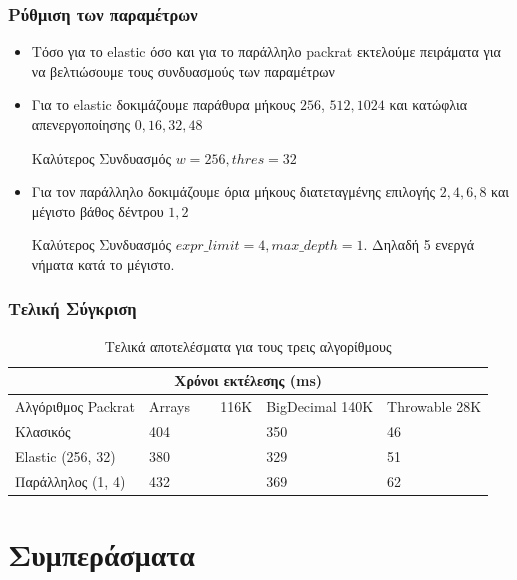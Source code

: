 \documentclass{beamer}
\begin{document}
\begin{frame}
  \frametitle{Ρύθμιση των παραμέτρων}
  \begin{itemize}
	\item Τόσο για το elastic όσο και για το παράλληλο packrat εκτελούμε πειράματα για να βελτιώσουμε τους συνδυασμούς των παραμέτρων \pause
	\item Για το elastic δοκιμάζουμε παράθυρα μήκους $256$, $512, 1024$ και κατώφλια απενεργοποίησης $0, 16, 32, 48$ \pause
	  \begin{block}{Καλύτερος Συνδυασμός}
		$w = 256, thres = 32$
	  \end{block} \pause
	\item Για τον παράλληλο δοκιμάζουμε όρια μήκους διατεταγμένης επιλογής $2, 4, 6, 8$ και μέγιστο βάθος δέντρου $1, 2$ \pause
	  \begin{block}{Καλύτερος Συνδυασμός}
		$expr\_limit = 4, max\_depth = 1$. Δηλαδή 5 ενεργά νήματα κατά το μέγιστο.
	  \end{block} 
  \end{itemize}
\end{frame}

\begin{frame}
  \frametitle{Τελική Σύγκριση}

\begin{table}[!ht]
\begin{tabular}{ |p{3cm}||p{2cm}|p{2cm}|p{2cm}|  }
 \hline
  \multicolumn{4}{|c|}{Χρόνοι εκτέλεσης (ms)} \\
 \hline
  Αλγόριθμος Packrat& Arrays ~~~  116K &BigDecimal 140K &Throwable 28K\\
 \hline
 Κλασικός & 404 & 350 & \cellcolor{green!45}46\\
  Elastic (256, 32) & \cellcolor{green!45}380 & \cellcolor{green!45}329 & 51\\
  Παράλληλος (1, 4) & 432 & 369 & 62\\
 \hline
\end{tabular}
  \caption{Τελικά αποτελέσματα για τους τρεις αλγορίθμους}
\end{table}

\end{frame}

\section{Συμπεράσματα}
\end{document}

